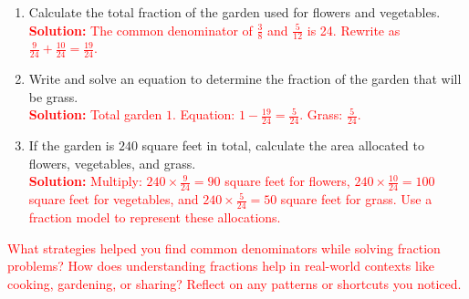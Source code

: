 \documentclass[11pt]{article}
\begin{document}
\begin{tcolorbox}[colframe=black!60, colback=white, 
coltitle=black, colbacktitle=black!15, fonttitle=\bfseries\Large, 
title=Performance Task: Planning a Garden - Answer Key, halign title=center, left=10pt, right=10pt, top=10pt, bottom=50pt]
\begin{enumerate}[itemsep=4em]
    \item Calculate the total fraction of the garden used for flowers and vegetables.\\
    \textcolor{red}{\textbf{Solution:} The common denominator of \( \frac{3}{8} \) and \( \frac{5}{12} \) is 24. Rewrite as \( \frac{9}{24} + \frac{10}{24} = \frac{19}{24} \).}

    \item Write and solve an equation to determine the fraction of the garden that will be grass.\\
    \textcolor{red}{\textbf{Solution:} Total garden \( 1 \). Equation: \( 1 - \frac{19}{24} = \frac{5}{24} \). Grass: \( \frac{5}{24} \).}

    \item If the garden is \( 240 \) square feet in total, calculate the area allocated to flowers, vegetables, and grass.\\
    \textcolor{red}{\textbf{Solution:} Multiply: \( 240 \times \frac{9}{24} = 90 \) square feet for flowers, \( 240 \times \frac{10}{24} = 100 \) square feet for vegetables, and \( 240 \times \frac{5}{24} = 50 \) square feet for grass. Use a fraction model to represent these allocations.}
\end{enumerate}
\end{tcolorbox}

\begin{tcolorbox}[colframe=black!60, colback=white, 
coltitle=black, colbacktitle=black!15, fonttitle=\bfseries\Large, 
title=Reflection, halign title=center, left=10pt, right=10pt, top=10pt, bottom=80pt]
\textcolor{red}{What strategies helped you find common denominators while solving fraction problems? How does understanding fractions help in real-world contexts like cooking, gardening, or sharing? Reflect on any patterns or shortcuts you noticed.}
\end{tcolorbox}
\end{document}

